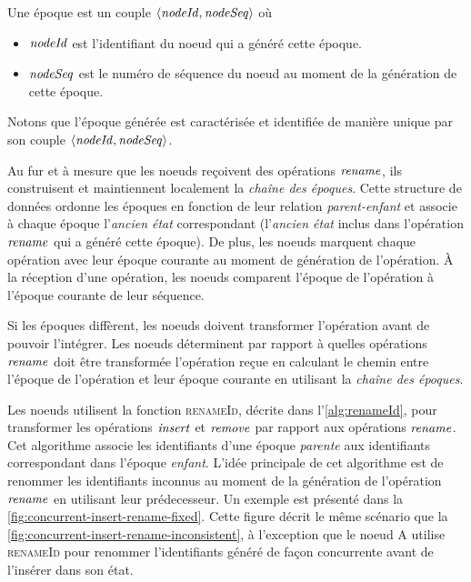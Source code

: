 \begin{definition}[Époque]
  Une époque est un couple $\langle \mathit{nodeId}, \mathit{nodeSeq} \rangle$ où
  \begin{itemize}
    \item $\mathit{nodeId}$ est l'identifiant du noeud qui a généré cette époque.
    \item $\mathit{nodeSeq}$ est le numéro de séquence du noeud au moment de la génération de cette époque.
  \end{itemize}
\end{definition}

Notons que l'époque générée est caractérisée et identifiée de manière unique par son couple $\langle \mathit{nodeId}, \mathit{nodeSeq} \rangle$.

Au fur et à mesure que les noeuds reçoivent des opérations $\mathit{rename}$, ils construisent et maintiennent localement la \emph{chaîne des époques}.
Cette structure de données ordonne les époques en fonction de leur relation \emph{parent-enfant} et associe à chaque époque l'\emph{ancien état} correspondant (\ie l'\emph{ancien état} inclus dans l'opération $\mathit{rename}$ qui a généré cette époque).
De plus, les noeuds marquent chaque opération avec leur époque courante au moment de génération de l'opération.
À la réception d'une opération, les noeuds comparent l'époque de l'opération à l'époque courante de leur séquence.

Si les époques diffèrent, les noeuds doivent transformer l'opération avant de pouvoir l'intégrer.
Les noeuds déterminent par rapport à quelles opérations $\mathit{rename}$ doit être transformée l'opération reçue en calculant le chemin entre l'époque de l'opération et leur époque courante en utilisant la \emph{chaîne des époques}.

Les noeuds utilisent la fonction \textsc{renameId}, décrite dans l'\autoref{alg:renameId}, pour transformer les opérations $\mathit{insert}$ et $\mathit{remove}$ par rapport aux opérations $\mathit{rename}$.
Cet algorithme associe les identifiants d'une époque \emph{parente} aux identifiants correspondant dans l'époque \emph{enfant}.
L'idée principale de cet algorithme est de renommer les identifiants inconnus au moment de la génération de l'opération $\mathit{rename}$ en utilisant leur prédecesseur.
Un exemple est présenté dans la \autoref{fig:concurrent-insert-rename-fixed}.
Cette figure décrit le même scénario que la \autoref{fig:concurrent-insert-rename-inconsistent}, à l'exception que le noeud A utilise \textsc{renameId} pour renommer l'identifiants généré de façon concurrente avant de l'insérer dans son état.

